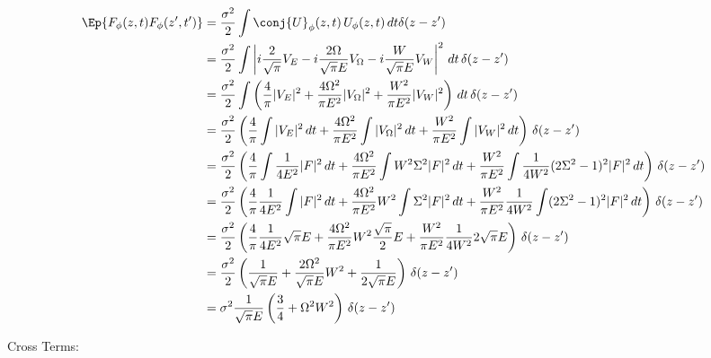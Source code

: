 \begin{equation}
\begin{split}
\Ep{F_\phi(z,t) F_\phi(z',t')} &= \frac{\sigma^2}{2} \int \conj{U}_\phi(z,t)\, U_\phi(z,t) \,dt \delta(z-z') \\
&= \frac{\sigma^2}{2} \int \left| i\frac{2}{\sqrt{\pi}} V_E - i\frac{2\Omega}{\sqrt{\pi} E} V_{\Omega} - i \frac{W}{\sqrt{\pi} E} V_W \right|^2 \,dt \, \delta(z-z')\\
&= \frac{\sigma^2}{2} \int  \left( \frac{4}{\pi} |V_E|^2 + \frac{4\Omega^2}{\pi E^2} |V_{\Omega}|^2 +  \frac{W^2}{\pi E^2} |V_W|^2\right) \,dt \, \delta(z-z')\\
&= \frac{\sigma^2}{2}  \left( \frac{4}{\pi} \int  |V_E|^2\,dt + \frac{4\Omega^2}{\pi E^2} \int  |V_{\Omega}|^2\,dt  +  \frac{W^2}{\pi E^2} \int  |V_W|^2 \,dt\right)  \, \delta(z-z')\\
&= \frac{\sigma^2}{2}  \left( \frac{4}{\pi} \int  \frac{1}{4E^2} |F|^2\,dt + \frac{4\Omega^2}{\pi E^2} \int  W^2 \Sigma^2 |F|^2\,dt  +  \frac{W^2}{\pi E^2} \int \frac{1}{4W^2}(2\Sigma^2-1)^2|F|^2 \,dt\right)  \, \delta(z-z')\\
&= \frac{\sigma^2}{2}  \left( \frac{4}{\pi}\frac{1}{4E^2} \int   |F|^2\,dt + \frac{4\Omega^2}{\pi E^2} W^2 \int   \Sigma^2 |F|^2\,dt  +  \frac{W^2}{\pi E^2} \frac{1}{4W^2} \int (2\Sigma^2-1)^2|F|^2 \,dt\right)  \, \delta(z-z')\\
&= \frac{\sigma^2}{2}  \left( \frac{4}{\pi}\frac{1}{4E^2} \sqrt{\pi} E  + \frac{4\Omega^2}{\pi E^2} W^2 \frac{\sqrt{\pi}}{2}E  +  \frac{W^2}{\pi E^2} \frac{1}{4W^2} 2\sqrt{\pi} E \right)  \, \delta(z-z')\\
&= \frac{\sigma^2}{2}  \left( \frac{1}{\sqrt{\pi}E}   + \frac{2\Omega^2}{\sqrt{\pi} E} W^2   +  \frac{1}{2\sqrt{\pi} E}  \right)  \, \delta(z-z')\\
&= \sigma^2\frac{1}{\sqrt{\pi}E}  \left( \frac{3}{4}   + \Omega^2 W^2   \right)  \, \delta(z-z')\\
\end{split}
\end{equation}


Cross Terms:


